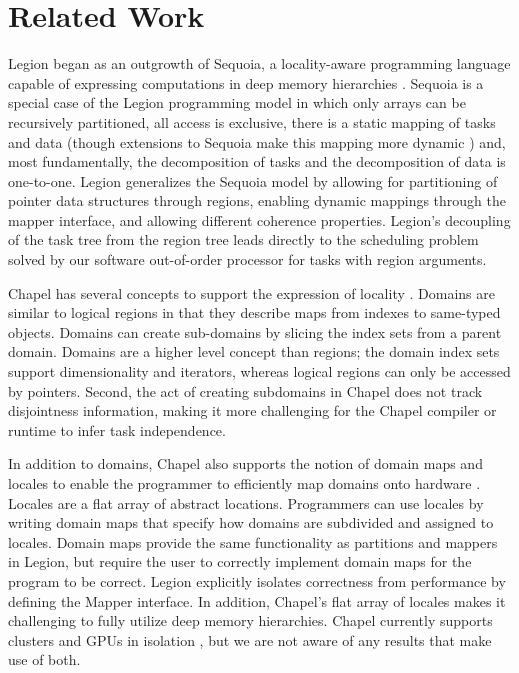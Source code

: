 
\section{Related Work}
\label{sec:related}

Legion began as an outgrowth of Sequoia, a locality-aware programming language capable
of expressing computations in deep memory hierarchies
\cite{Fatahalian06}.  Sequoia is a special case of the Legion
programming model in which only arrays can be recursively partitioned,
all access is exclusive, there is a static mapping of tasks and data (though
extensions to Sequoia make this mapping more dynamic \cite{BCSA11}) and, most fundamentally, the decomposition of tasks and the decomposition
of data is one-to-one.  Legion generalizes the Sequoia model by allowing for
partitioning of pointer data structures through regions, enabling dynamic mappings through
the mapper interface, and allowing different coherence
properties.  Legion's decoupling of the task tree from the region tree leads directly to the scheduling problem solved by our software out-of-order processor for tasks with region arguments.

Chapel has several concepts to support the expression of locality \cite{Chamberlain:Chapel}.
Domains are similar to logical regions in that they describe maps from indexes
to same-typed objects.  Domains can create sub-domains by slicing the index sets from
a parent domain.  Domains are a higher level concept than regions; the domain index sets 
support dimensionality and iterators, whereas  logical regions can only be accessed by pointers.  
Second, the act of creating subdomains in Chapel does not track disjointness information,
making it more challenging for the Chapel compiler or runtime to infer task independence.

In addition to domains, Chapel also supports the notion of domain maps and locales to enable 
the programmer to efficiently map domains onto hardware \cite{CHAPEL11}.  Locales are a flat array
of abstract locations.  Programmers can use locales by writing domain maps that specify
how domains are subdivided and assigned to locales.  Domain maps provide the same functionality
as partitions and mappers in Legion, but require the user to correctly implement domain
maps for the program to be correct.  Legion explicitly isolates correctness
from performance by defining the Mapper interface.  In addition, Chapel's flat array of locales
makes it challenging to fully utilize deep memory hierarchies.  Chapel currently supports
clusters and GPUs in isolation \cite{CHAPELGPU}, but we are not aware of any results that 
make use of both.

